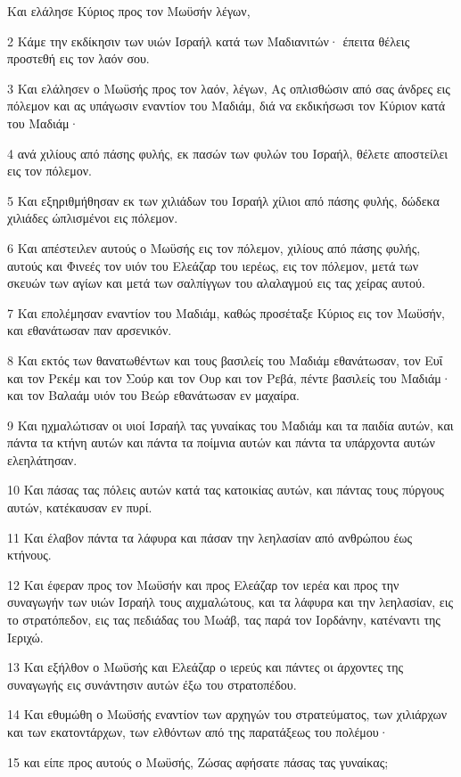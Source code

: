 \par Και ελάλησε Κύριος προς τον Μωϋσήν λέγων,
\par 2 Κάμε την εκδίκησιν των υιών Ισραήλ κατά των Μαδιανιτών· έπειτα θέλεις προστεθή εις τον λαόν σου.
\par 3 Και ελάλησεν ο Μωϋσής προς τον λαόν, λέγων, Ας οπλισθώσιν από σας άνδρες εις πόλεμον και ας υπάγωσιν εναντίον του Μαδιάμ, διά να εκδικήσωσι τον Κύριον κατά του Μαδιάμ·
\par 4 ανά χιλίους από πάσης φυλής, εκ πασών των φυλών του Ισραήλ, θέλετε αποστείλει εις τον πόλεμον.
\par 5 Και εξηριθμήθησαν εκ των χιλιάδων του Ισραήλ χίλιοι από πάσης φυλής, δώδεκα χιλιάδες ώπλισμένοι εις πόλεμον.
\par 6 Και απέστειλεν αυτούς ο Μωϋσής εις τον πόλεμον, χιλίους από πάσης φυλής, αυτούς και Φινεές τον υιόν του Ελεάζαρ του ιερέως, εις τον πόλεμον, μετά των σκευών των αγίων και μετά των σαλπίγγων του αλαλαγμού εις τας χείρας αυτού.
\par 7 Και επολέμησαν εναντίον του Μαδιάμ, καθώς προσέταξε Κύριος εις τον Μωϋσήν, και εθανάτωσαν παν αρσενικόν.
\par 8 Και εκτός των θανατωθέντων και τους βασιλείς του Μαδιάμ εθανάτωσαν, τον Ευΐ και τον Ρεκέμ και τον Σούρ και τον Ουρ και τον Ρεβά, πέντε βασιλείς του Μαδιάμ· και τον Βαλαάμ υιόν του Βεώρ εθανάτωσαν εν μαχαίρα.
\par 9 Και ηχμαλώτισαν οι υιοί Ισραήλ τας γυναίκας του Μαδιάμ και τα παιδία αυτών, και πάντα τα κτήνη αυτών και πάντα τα ποίμνια αυτών και πάντα τα υπάρχοντα αυτών ελεηλάτησαν.
\par 10 Και πάσας τας πόλεις αυτών κατά τας κατοικίας αυτών, και πάντας τους πύργους αυτών, κατέκαυσαν εν πυρί.
\par 11 Και έλαβον πάντα τα λάφυρα και πάσαν την λεηλασίαν από ανθρώπου έως κτήνους.
\par 12 Και έφεραν προς τον Μωϋσήν και προς Ελεάζαρ τον ιερέα και προς την συναγωγήν των υιών Ισραήλ τους αιχμαλώτους, και τα λάφυρα και την λεηλασίαν, εις το στρατόπεδον, εις τας πεδιάδας του Μωάβ, τας παρά τον Ιορδάνην, κατέναντι της Ιεριχώ.
\par 13 Και εξήλθον ο Μωϋσής και Ελεάζαρ ο ιερεύς και πάντες οι άρχοντες της συναγωγής εις συνάντησιν αυτών έξω του στρατοπέδου.
\par 14 Και εθυμώθη ο Μωϋσής εναντίον των αρχηγών του στρατεύματος, των χιλιάρχων και των εκατοντάρχων, των ελθόντων από της παρατάξεως του πολέμου·
\par 15 και είπε προς αυτούς ο Μωϋσής, Ζώσας αφήσατε πάσας τας γυναίκας;
